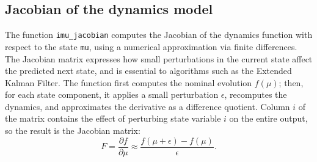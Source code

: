 \documentclass[11pt]{article}
\begin{document}
\subsection{Jacobian of the dynamics model}
The function \texttt{imu\_jacobian} computes the Jacobian of the dynamics function with respect to the
state \texttt{mu}, using a numerical approximation via finite differences. The Jacobian matrix
expresses how small perturbations in the current state affect the predicted next state, and is
essential to algorithms such as the Extended Kalman Filter. The function first computes the nominal
evolution $f(\mu)$; then, for each state component, it applies a small perturbation $\epsilon$,
recomputes the dynamics, and approximates the derivative as a difference quotient. Column $i$ of the
matrix contains the effect of perturbing state variable $i$ on the entire output, so the result is the
Jacobian matrix:
\[
F = \frac{\partial f}{\partial \mu} \approx \frac{f(\mu+\epsilon)-f(\mu)}{\epsilon}.
\]
\end{document}
